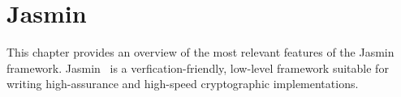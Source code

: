 \chapter{Jasmin}\label{chap:jasmin}

This chapter provides an overview of the most relevant features of the Jasmin framework. 
Jasmin~\cite{10.1145/3133956.3134078,almeida2020last} is a verfication-friendly, low-level framework
suitable for writing high-assurance and high-speed cryptographic implementations.
